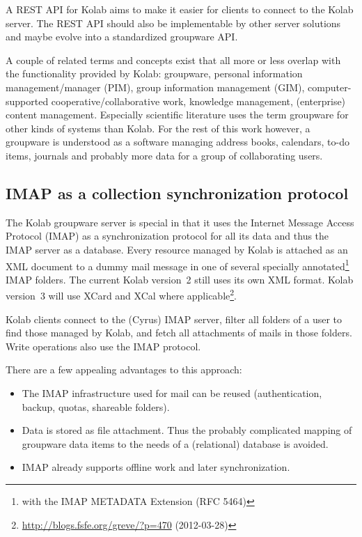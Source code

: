 \documentclass[11pt,a4paper,headsepline,twoside]{scrartcl}		%
\newcommand{\citeurl}[2]{\url{#1} (#2)}
\begin{document}
A REST API for Kolab aims to make it easier for clients to connect to the Kolab
server. The REST API should also be implementable by other server solutions and
maybe evolve into a standardized groupware API.

A couple of related terms and concepts exist that all more or less overlap with
the functionality provided by Kolab: groupware, personal information
management/manager (PIM), group information management (GIM), computer-supported
cooperative/collaborative work, knowledge management, (enterprise) content
management. Especially scientific literature uses the term groupware for other
kinds of systems than Kolab\cite[sec. 2.1]{Stoermer2004}. For the rest of this
work however, a groupware is understood as a software managing address books,
calendars, to-do items, journals and probably more data for a group of
collaborating users.

\subsection{IMAP as a collection synchronization protocol}
\label{sec:imap-as-collection}

The Kolab groupware server is special in that it uses the Internet Message
Access Protocol (IMAP) as a synchronization protocol for all its data and thus
the IMAP server as a database. Every resource managed by Kolab is attached as an
XML document to a dummy mail message in one of several specially
annotated\footnote{with the IMAP METADATA Extension (RFC 5464)} IMAP
folders. The current Kolab version~2 still uses its own XML format. Kolab
version~3 will use XCard and XCal where
applicable\footnote{\citeurl{http://blogs.fsfe.org/greve/?p=470}{2012-03-28}}.

Kolab clients connect to the (Cyrus) IMAP server, filter all folders of a user
to find those managed by Kolab, and fetch all attachments of mails in those
folders. Write operations also use the IMAP protocol.

There are a few appealing advantages to this approach:

\begin{itemize}
\item The IMAP infrastructure used for mail can be reused (authentication,
  backup, quotas, shareable folders).
\item Data is stored as file attachment. Thus the probably complicated mapping
  of groupware data items to the needs of a (relational) database is avoided.
  \item IMAP already supports offline work and later synchronization.
\end{itemize}
\end{document}
